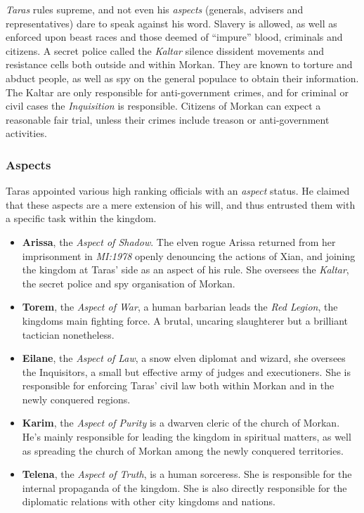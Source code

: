 \emph{Taras} rules supreme, and not even his \emph{aspects} (generals,
advisers and representatives) dare to speak against his word. Slavery is
allowed, as well as enforced upon beast races and those deemed of ``impure''
blood, criminals and citizens. A secret police called the \emph{Kaltar}
silence dissident movements and resistance cells both outside and within
Morkan. They are known to torture and abduct people, as well as spy on the
general populace to obtain their information. The Kaltar are only responsible
for anti-government crimes, and for criminal or civil cases the
\emph{Inquisition} is responsible. Citizens of Morkan can expect a reasonable
fair trial, unless their crimes include treason or anti-government activities.

\subsubsection*{Aspects}


Taras appointed various high ranking officials with an \emph{aspect} status.
He claimed that these aspects are a mere extension of his will, and thus
entrusted them with a specific task within the kingdom.

\begin{itemize}[noitemsep]
  \item \textbf{Arissa}, the \emph{Aspect of Shadow}. The elven rogue Arissa
    returned from her imprisonment in \emph{MI:1978} openly denouncing the
    actions of Xian, and joining the kingdom at Taras' side as an aspect of
    his rule. She oversees the \emph{Kaltar}, the secret police and spy
    organisation of Morkan.

  \item \textbf{Torem}, the \emph{Aspect of War}, a human barbarian leads the
    \emph{Red Legion}, the kingdoms main fighting force. A brutal, uncaring
    slaughterer but a brilliant tactician nonetheless.

  \item \textbf{Eilane}, the \emph{Aspect of Law}, a snow elven diplomat and
    wizard, she oversees the Inquisitors, a small but effective army of judges
    and executioners. She is responsible for enforcing Taras' civil law both
    within Morkan and in the newly conquered regions.

  \item \textbf{Karim}, the \emph{Aspect of Purity} is a dwarven cleric of the
    church of Morkan. He's mainly responsible for leading the kingdom in
    spiritual matters, as well as spreading the church of Morkan among the
    newly conquered territories.

  \item \textbf{Telena}, the \emph{Aspect of Truth}, is a human sorceress. She
    is responsible for the internal propaganda of the kingdom. She is also
    directly responsible for the diplomatic relations with other city kingdoms
    and nations.

\end{itemize}

